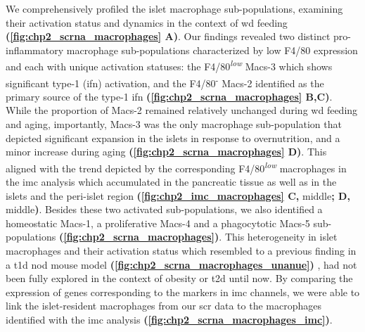 \par We comprehensively profiled the islet macrophage sub-populations, examining their activation status and dynamics in the context of \gls{wd} feeding \textbf{(\autoref{fig:chp2_scrna_macrophages} A)}. Our findings revealed two distinct pro-inflammatory macrophage sub-populations characterized by low F4/80 expression and each with unique activation statuses: the F4/80\textsuperscript{\textit{low}} Macs-3 which shows significant type-1  (\gls{ifn}) activation, and the F4/80\textsuperscript{-} Macs-2 identified as the primary source of the type-1 \gls{ifn} \textbf{(\autoref{fig:chp2_scrna_macrophages} B,C)}. While the proportion of Macs-2 remained relatively unchanged during \gls{wd} feeding and aging, importantly, Macs-3 was the only macrophage sub-population that depicted significant expansion in the islets in response to overnutrition, and a minor increase during aging \textbf{(\autoref{fig:chp2_scrna_macrophages} D)}. This aligned with the trend depicted by the corresponding F4/80\textsuperscript{\textit{low}} macrophages in the \gls{imc} analysis which accumulated in the pancreatic tissue as well as in the islets and the peri-islet region \textbf{(\autoref{fig:chp2_imc_macrophages} C,} middle\textbf{; D,} middle\textbf{)}. Besides these two activated sub-populations, we also identified a homeostatic Macs-1, a proliferative Macs-4 and a phagocytotic Macs-5 sub-populations \textbf{(\autoref{fig:chp2_scrna_macrophages})}. This heterogeneity in islet macrophages and their activation status which resembled to a previous finding in a \gls{t1d} \gls{nod} mouse model \textbf{(\autoref{fig:chp2_scrna_macrophages_unanue})} \textbf{\cite{zakharov_single-cell_2020}}, had not been fully explored in the context of obesity or \gls{t2d} until now. By comparing the expression of genes corresponding to the markers in \gls{imc} channels, we were able to link the islet-resident macrophages from our \gls{scr} data to the macrophages identified with the \gls{imc} analysis \textbf{(\autoref{fig:chp2_scrna_macrophages_imc})}.\\   %

